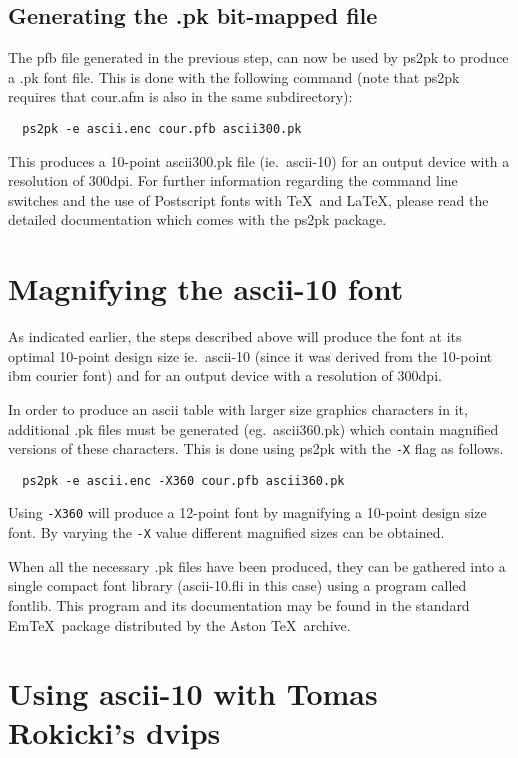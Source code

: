 \subsection{Generating the {\sc .pk} bit-mapped file}

The {\sc pfb} file generated in the previous step, can now be used
by {\sc ps2pk} to produce a {\sc .pk} font file. This is done with
the following command  (note that
{\sc ps2pk} requires that  {\sc cour.afm}
is also in the same subdirectory):
\begin{verbatim}
  ps2pk -e ascii.enc cour.pfb ascii300.pk
\end{verbatim}
This produces a 10-point {\sc ascii300.pk} file (ie.\ {\sc ascii-10}) for an output device
with a resolution of 300dpi.
For further information regarding the command line switches and the use
of Postscript fonts with \TeX\ and \LaTeX, please read the detailed
documentation which comes with the {\sc ps2pk} package.


\section{Magnifying the {\sc ascii-10} font}

As indicated  earlier, the steps described above will produce the font at
its optimal 10-point design size ie.\ {\sc ascii-10} (since it was derived
from the 10-point {\sc ibm courier} font) and for an output device with
a resolution of 300dpi.

In order to produce an {\sc ascii} table with larger size graphics characters in
it, additional {\sc .pk} files must be generated (eg.\ {\sc ascii360.pk})
which contain magnified versions of these characters. This is done using
{\sc ps2pk} with the \verb|-X| flag as follows.
\begin{verbatim}
  ps2pk -e ascii.enc -X360 cour.pfb ascii360.pk
\end{verbatim}
Using \verb|-X360| will produce a 12-point font by magnifying a 10-point
design size font. By varying the \verb|-X| value different magnified sizes
can be obtained.

When all the necessary {\sc .pk} files have been produced, they can be gathered into a single compact font library ({\sc ascii-10.fli} in this case) using a program called {\sc fontlib}. This program and its documentation may be found in the standard Em\TeX\ package distributed by the Aston \TeX\ archive.
 
\section{Using {\sc ascii-10} with Tomas Rokicki's {\sc dvips}}

